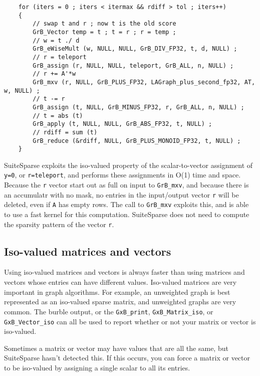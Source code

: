 \documentclass[12pt]{article}
\begin{document}
    {\footnotesize
    \begin{verbatim}
    for (iters = 0 ; iters < itermax && rdiff > tol ; iters++)
    {
        // swap t and r ; now t is the old score
        GrB_Vector temp = t ; t = r ; r = temp ;
        // w = t ./ d
        GrB_eWiseMult (w, NULL, NULL, GrB_DIV_FP32, t, d, NULL) ;
        // r = teleport
        GrB_assign (r, NULL, NULL, teleport, GrB_ALL, n, NULL) ;
        // r += A'*w
        GrB_mxv (r, NULL, GrB_PLUS_FP32, LAGraph_plus_second_fp32, AT, w, NULL) ;
        // t -= r
        GrB_assign (t, NULL, GrB_MINUS_FP32, r, GrB_ALL, n, NULL) ;
        // t = abs (t)
        GrB_apply (t, NULL, NULL, GrB_ABS_FP32, t, NULL) ;
        // rdiff = sum (t)
        GrB_reduce (&rdiff, NULL, GrB_PLUS_MONOID_FP32, t, NULL) ;
    } \end{verbatim}}

SuiteSparse exploits the iso-valued property of the scalar-to-vector assignment
of \verb'y=0', or \verb'r=teleport', and performs these assignments in O(1)
time and space.  Because the \verb'r' vector start out as full on input to
\verb'GrB_mxv', and because there is an accumulatr with no mask, no entries in
the input/output vector \verb'r' will be deleted, even if \verb'A' has empty
rows.  The call to \verb'GrB_mxv' exploits this, and is able to use a fast
kernel for this computation.  SuiteSparse does not need to compute the sparsity
pattern of the vector \verb'r'.

\subsection{Iso-valued matrices and vectors}

Using iso-valued matrices and vectors is always faster than using matrices and
vectors whose entries can have different values.  Iso-valued matrices are very
important in graph algorithms.  For example, an unweighted graph is best
represented as an iso-valued sparse matrix, and unweighted graphs are very
common.  The burble output, or the \verb'GxB_print', \verb'GxB_Matrix_iso', or
\verb'GxB_Vector_iso' can all be used to report whether or not your matrix or
vector is iso-valued.

Sometimes a matrix or vector may have values that are all the same, but
SuiteSparse hasn't detected this.  If this occurs, you can force a matrix
or vector to be iso-valued by assigning a single scalar to all its entries.
\end{document}
